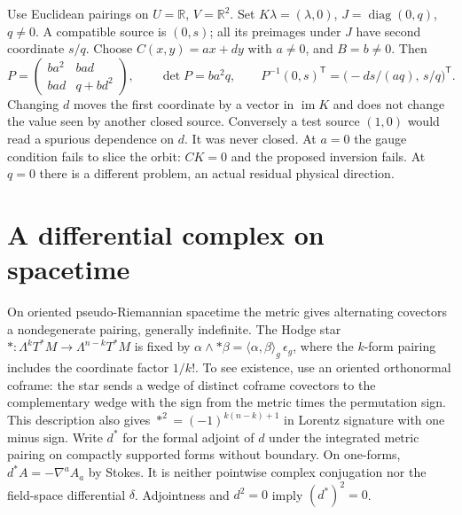 \begin{example}\label{f:gauge-matrix}
Use Euclidean pairings on $U=\mathbb R$, $V=\mathbb R^2$. Set $K\lambda=(\lambda,0)$, $J=\operatorname{diag}(0,q)$, $q\ne0$. A compatible source is $(0,s)$; all its preimages under $J$ have second coordinate $s/q$. Choose $C(x,y)=a x+d y$ with $a\ne0$, and $B=b\ne0$. Then
\[
 P=\begin{pmatrix}ba^2&bad\\ bad&q+bd^2\end{pmatrix},\qquad
 \det P=ba^2q,\qquad P^{-1}(0,s)^{\mathsf T}
   =\big(-ds/(a q),\,s/q\big)^{\mathsf T}.
\]
Changing $d$ moves the first coordinate by a vector in $\operatorname{im}K$ and does not change the value seen by another closed source. Conversely a test source $(1,0)$ would read a spurious dependence on $d$. It was never closed. At $a=0$ the gauge condition fails to slice the orbit: $CK=0$ and the proposed inversion fails. At $q=0$ there is a different problem, an actual residual physical direction.
\end{example}

\section{A differential complex on spacetime}\label{f:hodge}
On oriented pseudo-Riemannian spacetime the metric gives alternating covectors a nondegenerate pairing, generally indefinite. The Hodge star $*:\Lambda^kT^*M\to\Lambda^{n-k}T^*M$ is fixed by $\alpha\wedge *\beta=\langle\alpha,\beta\rangle_g\,\epsilon_g$, where the $k$-form pairing includes the coordinate factor $1/k!$. To see existence, use an oriented orthonormal coframe: the star sends a wedge of distinct coframe covectors to the complementary wedge with the sign from the metric times the permutation sign. This description also gives $*^2=(-1)^{k(n-k)+1}$ in Lorentz signature with one minus sign. Write $d^*$ for the formal adjoint of $d$ under the integrated metric pairing on compactly supported forms without boundary. On one-forms, $d^*A=-\nabla^a A_a$ by Stokes. It is neither pointwise complex conjugation nor the field-space differential $\delta$. Adjointness and $d^2=0$ imply $(d^*)^2=0$.

